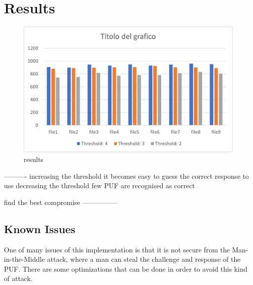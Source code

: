\chapter{Results}
\begin{figure}[H]
\vspace{0.5cm}
\includegraphics[width=\textwidth]{images/results.png}
\caption{results }
\label{fig:results} %
\end{figure}

----------
increasing the threshold it becomes easy to guess the correct response to use
decreasing the threshold few PUF are recognised as correct

find the best compromise
---------------


\section{Known Issues}
One of many issues of this implementation is that it is not secure from the Man-in-the-Middle attack, where a man can steal the challenge and response of the PUF.
There are some optimizations that can be done in order to avoid this kind of attack.


